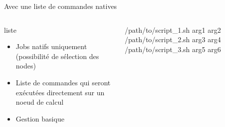 \documentclass{beamer}
\begin{document}
\begin{frame}{Avec une liste de commandes natives}
	\begin{columns}
	\begin{column}[l]{0.4\linewidth}
        \begin{exampleblock}{liste}
            \begin{itemize}
                \item Jobs natifs uniquement (possibilité de sélection des nodes)
                \item Liste de commandes qui seront exécutées directement sur un noeud de calcul
                \item Gestion basique
            \end{itemize}
        \end{exampleblock}
	\end{column}
	\begin{column}[r]{0.6\linewidth}
        /path/to/script\_1.sh arg1 arg2\newline
        /path/to/script\_2.sh arg3 arg4\newline
        /path/to/script\_3.sh arg5 arg6\newline
	\end{column}
	\end{columns}
    
\end{frame}
\end{document}
